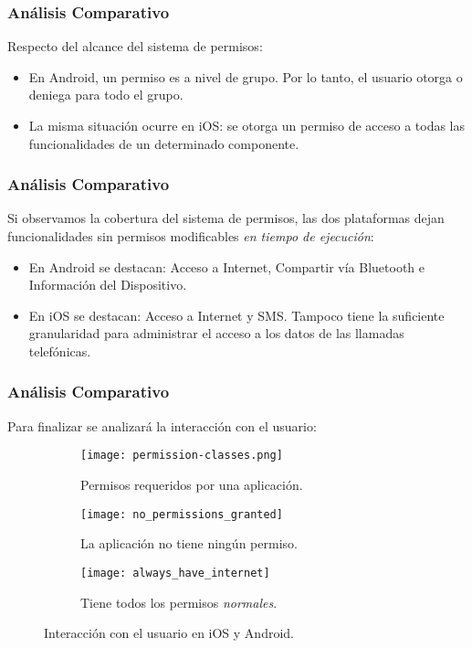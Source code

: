 \begin{frame}
 \frametitle{Análisis Comparativo}
Respecto del alcance del sistema de permisos:\pause
  \begin{itemize}[<+->]
   \item En Android, un permiso es a nivel de grupo. Por lo tanto, el usuario otorga o deniega para todo el grupo.
   \item La misma situación ocurre en iOS: se otorga un permiso de acceso a todas las funcionalidades de un determinado componente.
  \end{itemize}
\end{frame}
\begin{frame}
 \frametitle{Análisis Comparativo}
Si observamos la cobertura del sistema de permisos, \pause las dos plataformas dejan funcionalidades sin permisos modificables \emph{en tiempo de ejecución}:\pause
  \begin{itemize}[<+->]
   \item En Android se destacan: Acceso a Internet, Compartir vía Bluetooth e Información del Dispositivo.
   \item En iOS se destacan: Acceso a Internet y SMS. Tampoco tiene la suficiente granularidad para administrar el acceso a los datos de las llamadas telefónicas.
  \end{itemize}
\end{frame}
\begin{frame}
 \frametitle{Análisis Comparativo}
\small {Para finalizar se analizará la interacción con el usuario:}\pause
\begin{figure}
	\centering
	\begin{subfigure}{.23\linewidth}
		\texttt{[image: permission-classes.png]}
		\caption{Permisos requeridos por una aplicación.}
		\label{fig:ch05:ios_all_permissions}
	\end{subfigure}\pause
	\begin{subfigure}{.23\linewidth}
		\texttt{[image: no\_permissions\_granted]}
		\caption{La aplicación no tiene ningún permiso.}
		\label{fig:ch05:without_permissions}
	\end{subfigure}\pause
	\begin{subfigure}{.23\linewidth}
		\texttt{[image: always\_have\_internet]}
		\caption{Tiene todos los permisos \emph{normales}.}
		\label{fig:ch05:always_have_internet}
	\end{subfigure}
	\caption{Interacción con el usuario en iOS y Android.}
\end{figure}
\end{frame}